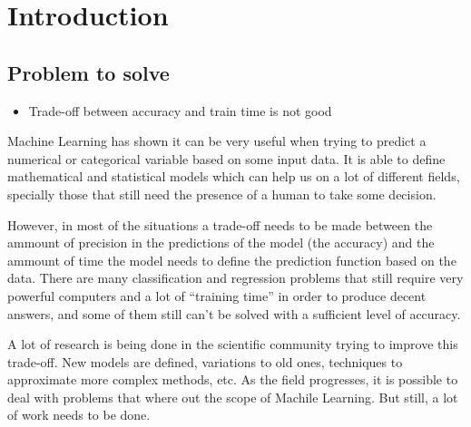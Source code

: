 
\chapter{Introduction} %

\label{Chapter1} %



\section{Problem to solve}

\begin{note}
  \begin{itemize}
    \item Trade-off between accuracy and train time is not good
  \end{itemize}
\end{note}
\begin{pre-delivery}
  Machine Learning has shown it can be very useful when trying to predict
  a numerical or categorical variable based on some input data. It is able to
  define mathematical and statistical models which can help us on a lot of
  different fields, specially those that still need the presence of a human
  to take some decision.

  However, in most of the situations a trade-off needs to be made between the
  ammount of precision in the predictions of the model (the accuracy) and the
  ammount of time the model needs to define the prediction function based on
  the data. There are many classification and regression problems that still
  require very powerful computers and a lot of ``training time'' in order to
  produce decent answers, and some of them still can't be solved with a
  sufficient level of accuracy.

  A lot of research is being done in the scientific community trying to improve this
  trade-off. New models are defined, variations to old ones, techniques to
  approximate more complex methods, etc. As the field progresses, it is
  possible to deal with problems that where out the scope of Machile Learning.
  But still, a lot of work needs to be done.
\end{pre-delivery}



